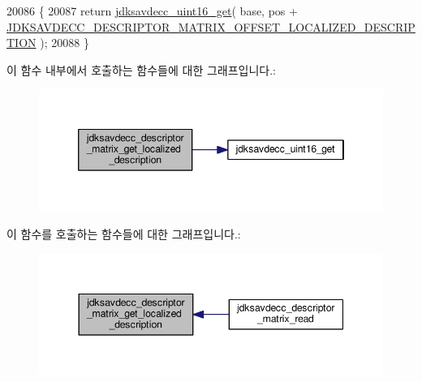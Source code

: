 \begin{DoxyCode}
20086 \{
20087     \textcolor{keywordflow}{return} \hyperlink{group__endian_ga3fbbbc20be954aa61e039872965b0dc9}{jdksavdecc\_uint16\_get}( base, pos + 
      \hyperlink{group__descriptor__matrix_gaee4e1928d01bbd0f5a2ea8aae8136d55}{JDKSAVDECC\_DESCRIPTOR\_MATRIX\_OFFSET\_LOCALIZED\_DESCRIPTION}
       );
20088 \}
\end{DoxyCode}


이 함수 내부에서 호출하는 함수들에 대한 그래프입니다.\+:
\nopagebreak
\begin{figure}[H]
\begin{center}
\leavevmode
\includegraphics[width=346pt]{group__descriptor__matrix_gae79c65e0a3f1a2209078196924d3a235_cgraph}
\end{center}
\end{figure}




이 함수를 호출하는 함수들에 대한 그래프입니다.\+:
\nopagebreak
\begin{figure}[H]
\begin{center}
\leavevmode
\includegraphics[width=344pt]{group__descriptor__matrix_gae79c65e0a3f1a2209078196924d3a235_icgraph}
\end{center}
\end{figure}


